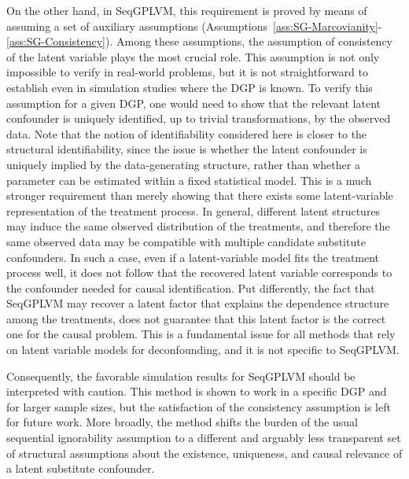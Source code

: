 On the other hand, in SeqGPLVM, this requirement 
is proved by means of assuming a set of auxiliary 
assumptions (Assumptions~\ref{ass:SG-Marcovianity}-\ref{ass:SG-Consistency}). 
Among these assumptions, the assumption of consistency of the latent variable 
plays the most crucial role. This assumption is not only impossible to verify in 
real-world problems, but it is not straightforward to establish even in simulation 
studies where 
the DGP is known. To verify this assumption for a given DGP, one would 
need to show that the 
relevant latent confounder is uniquely identified, up to trivial transformations, 
by the observed data. Note that the notion of identifiability considered here 
is closer to the structural identifiability, since the issue is whether the 
latent confounder is uniquely implied by the data-generating structure, 
rather than whether a parameter can be estimated within a fixed statistical model. 
This is a much 
stronger requirement than merely showing that there exists 
some latent-variable representation 
of the treatment process. In general, different latent structures 
may induce the same observed 
distribution of the treatments, and therefore the same observed 
data may be compatible with 
multiple candidate substitute confounders. In such a case, even if 
a latent-variable model fits 
the treatment process well, it does not follow that the 
recovered latent variable corresponds to 
the confounder needed for causal identification. Put differently, the fact that
SeqGPLVM 
may recover a latent factor that explains the dependence structure among the treatments, 
does not guarantee that this latent factor is the correct one for the 
causal problem. This is a fundamental issue for all methods that rely on latent 
variable models for deconfounding, and it is not specific to SeqGPLVM.

Consequently, the favorable simulation results for SeqGPLVM should be 
interpreted with caution. This method is shown to work in a specific DGP and for larger 
sample sizes, but the satisfaction of the consistency assumption is left for 
future work. More broadly, the method shifts the 
burden of the usual sequential ignorability assumption to a different and 
arguably less transparent set of 
structural assumptions about the existence, uniqueness, and causal relevance of a 
latent substitute 
confounder. 


